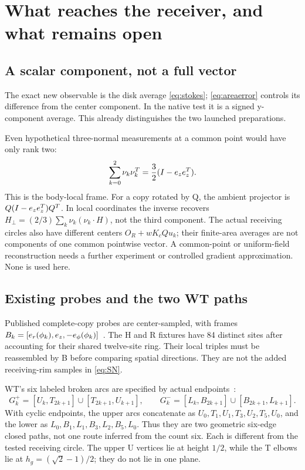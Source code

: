 \section{What reaches the receiver, and what remains open}\label{sec:scope}
\subsection{A scalar component, not a full vector}
The exact new observable is the disk average \eqref{eq:stokes}; \eqref{eq:areaerror} controls its difference from the center component. In the native test it is a signed y-component average. This already distinguishes the two launched preparations.

Even hypothetical three-normal measurements at a common point would have only rank two:
\begin{equation}\label{eq:ranktwo}
\sum_{k=0}^2\nu_k\nu_k^T=\frac32(I-e_ze_z^T).
\end{equation}
This is the body-local frame. For a copy rotated by Q, the ambient projector is
\(Q(I-e_ze_z^T)Q^T\). In local coordinates the inverse recovers
\(H_\perp=(2/3)\sum_k\nu_k(\nu_k\cdot H)\), not the third component.
The actual receiving circles also have different centers \(O_R+wK_cQ u_k\); their finite-area averages are not components of one common pointwise vector. A common-point or uniform-field reconstruction needs a further experiment or controlled gradient approximation. None is used here.

\subsection{Existing probes and the two WT paths}
Published complete-copy probes are center-sampled, with frames
\(B_k=[e_r(\phi_k),e_z,-e_\phi(\phi_k)]\)~\cite{PAIR,PAIRII}. The H and R fixtures have 84 distinct sites after accounting for their shared twelve-site ring. Their local triples must be reassembled by B before comparing spatial directions. They are not the added receiving-rim samples in \eqref{eq:SN}.

WT's six labeled broken arcs are specified by actual endpoints~\cite[setting, \texttt{eq:actualG}]{WT}:
\begin{equation}\label{eq:arcs}
G_k^+=[U_k,T_{2k+1}]\cup[T_{2k+1},U_{k+1}],\qquad
G_k^-=[L_k,B_{2k+1}]\cup[B_{2k+1},L_{k+1}].
\end{equation}
With cyclic endpoints, the upper arcs concatenate as
\(U_0,T_1,U_1,T_3,U_2,T_5,U_0\), and the lower as
\(L_0,B_1,L_1,B_3,L_2,B_5,L_0\). Thus they are two geometric six-edge closed paths, not one route inferred from the count six. Each is different from the tested receiving circle. The upper U vertices lie at height \(1/2\), while the T elbows lie at \(h_g=(\sqrt2-1)/2\); they do not lie in one plane.

